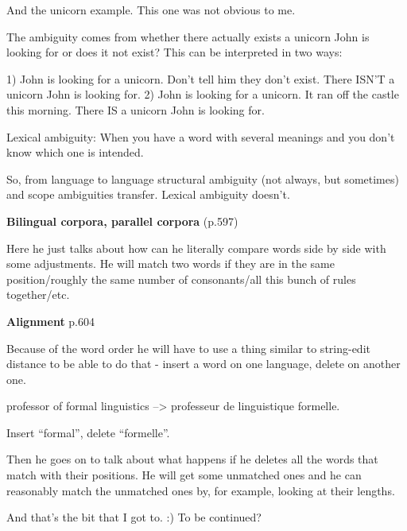 And the unicorn example. This one was not obvious to me.

The ambiguity comes from whether there actually exists a unicorn John is looking
for or does it not exist? This can be interpreted in two ways:

1) John is looking for a unicorn. Don't tell him they don't exist.
There ISN'T a unicorn John is looking for.
2) John is looking for a unicorn. It ran off the castle this morning.
There IS a unicorn John is looking for.

Lexical ambiguity: When you have a word with several meanings and you don't know
which one is intended.

So, from language to language structural ambiguity (not always, but sometimes)
and scope ambiguities transfer. Lexical ambiguity doesn't.

\textbf{Bilingual corpora, parallel corpora} (p.597)

Here he just talks about how can he literally compare words side by side with
some adjustments. He will match two words if they are in the same
position/roughly the same number of consonants/all this bunch of rules
together/etc.


\textbf{Alignment} p.604

Because of the word order he will have to use a thing similar to string-edit
distance to be able to do that - insert a word on one language, delete on
another one.

professor of formal linguistics --> professeur de linguistique formelle.

Insert ``formal'', delete ``formelle''.

Then he goes on to talk about what happens if he deletes all the words that
match with their positions. He will get some unmatched ones and he can
reasonably match the unmatched ones by, for example, looking at their lengths.

And that's the bit that I got to. :) 
To be continued?